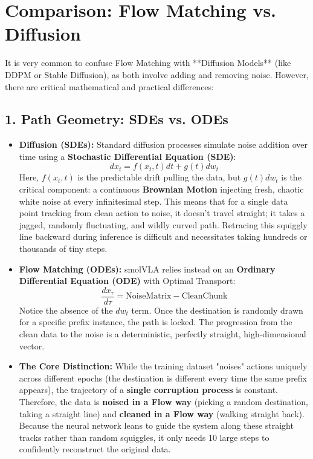 \documentclass[11pt,a4paper]{article}
\begin{document}
\section{Comparison: Flow Matching vs. Diffusion}
It is very common to confuse Flow Matching with **Diffusion Models** (like DDPM or Stable Diffusion), as both involve adding and removing noise. However, there are critical mathematical and practical differences:

\subsection{1. Path Geometry: SDEs vs. ODEs}
\begin{itemize}
    \item \textbf{Diffusion (SDEs):} Standard diffusion processes simulate noise addition over time using a \textbf{Stochastic Differential Equation (SDE)}:
    \[ dx_t = f(x_t, t)dt + g(t)dw_t \]
    Here, $f(x_t, t)$ is the predictable drift pulling the data, but $g(t)dw_t$ is the critical component: a continuous \textbf{Brownian Motion} injecting fresh, chaotic white noise at every infinitesimal step. This means that for a single data point tracking from clean action to noise, it doesn't travel straight; it takes a jagged, randomly fluctuating, and wildly curved path. Retracing this squiggly line backward during inference is difficult and necessitates taking hundreds or thousands of tiny steps.
    
    \item \textbf{Flow Matching (ODEs):} smolVLA relies instead on an \textbf{Ordinary Differential Equation (ODE)} with Optimal Transport:
    \[ \frac{dx_\tau}{d\tau} = \text{NoiseMatrix} - \text{CleanChunk} \]
    Notice the absence of the $dw_t$ term. Once the destination  is randomly drawn for a specific prefix instance, the path is locked. The progression from the clean data to the noise is a deterministic, perfectly straight, high-dimensional vector. 
    
    \item \textbf{The Core Distinction:} While the training dataset "noises" actions uniquely across different epochs (the destination  is different every time the same prefix appears), the trajectory of a \textbf{single corruption process} is constant. Therefore, the data is \textbf{noised in a Flow way} (picking a random destination, taking a straight line) and \textbf{cleaned in a Flow way} (walking straight back). Because the neural network leans to guide the system along these straight tracks rather than random squiggles, it only needs 10 large steps to confidently reconstruct the original data.
\end{itemize}
\end{document}
